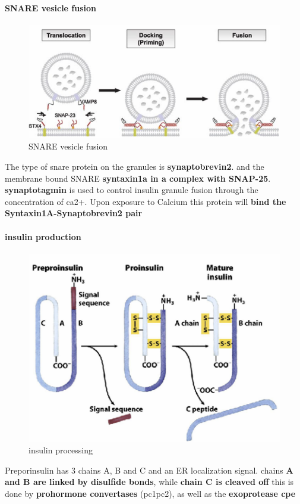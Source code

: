 \documentclass[../main.tex]{subfiles}
\begin{document}
\paragraph{SNARE vesicle fusion}
\begin{figure}[H]
    \centering
    \includegraphics[width=0.5\linewidth]{snare.png}
    \caption{SNARE vesicle fusion }
    \label{fig:enter-label}
\end{figure}
The type of snare protein on the granules is \textbf{\gls{synaptobrevin2}}. and the membrane bound SNARE \textbf{\gls{syntaxin1a} in a complex with SNAP-25}.  \textbf{\gls{synaptotagmin}} is used to control insulin granule fusion through the concentration of ca2+. Upon exposure to Calcium this protein will \textbf{bind the Syntaxin1A-Synaptobrevin2 pair}

\paragraph{insulin production}
\begin{figure}[H]
    \centering
    \includegraphics[width=0.5\linewidth]{insulinProduction.png}
    \caption{insulin processing}
    \label{fig:enter-label}
\end{figure}
Preporinsulin has 3 chains A, B and C and an ER localization signal. chains\textbf{ A and B are linked by disulfide bonds}, while \textbf{chain C is cleaved off} this is done by \textbf{prohormone convertases} (\gls{pc1pc2}), as well as the 
\textbf{exoprotease \gls{cpe}}
\end{document}
